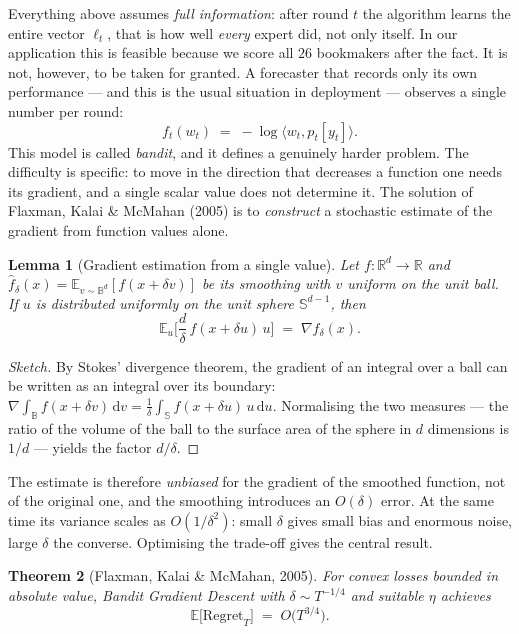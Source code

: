 \documentclass[12pt,a4paper,oneside]{report}
\renewcommand{\_}{\oldunderscore\allowbreak}
\theoremstyle{definition}
\theoremstyle{plain}
\newtheorem{theorem}{Theorem}[chapter]
\newtheorem{lemma}[theorem]{Lemma}
\theoremstyle{remark}
\begin{document}
Everything above assumes \emph{full information}: after round $t$ the algorithm learns the entire
vector $\ell_t$, that is how well \emph{every} expert did, not only itself. In our application
this is feasible because we score all $26$ bookmakers after the fact. It is not, however, to be
taken for granted. A forecaster that records only its own performance --- and this is the usual
situation in deployment --- observes a single number per round:
\[
f_t(w_t) \;=\; -\log\langle w_t, p_t[y_t]\rangle .
\]
This model is called \emph{bandit}, and it defines a genuinely harder problem. The difficulty is
specific: to move in the direction that decreases a function one needs its gradient, and a single
scalar value does not determine it. The solution of Flaxman, Kalai \& McMahan (2005) is to
\emph{construct} a stochastic estimate of the gradient from function values alone.

\begin{lemma}[Gradient estimation from a single value]
\label{lem:one-point}
Let $f:\mathbb{R}^d \to \mathbb{R}$ and $\hat{f}_\delta(x) = \mathbb{E}_{v\sim \mathbb{B}^d}
[f(x+\delta v)]$ be its smoothing with $v$ uniform on the unit \emph{ball}. If $u$ is distributed
uniformly on the unit \emph{sphere} $\mathbb{S}^{d-1}$, then
\[
\mathbb{E}_u\Big[ \frac{d}{\delta}\, f(x + \delta u)\, u \Big] \;=\; \nabla \hat{f}_\delta(x).
\]
\end{lemma}

\begin{proof}[Sketch]
By Stokes' divergence theorem, the gradient of an integral over a ball can be written as an
integral over its boundary: $\nabla \int_{\mathbb{B}} f(x+\delta v)\,\mathrm{d}v =
\frac{1}{\delta}\int_{\mathbb{S}} f(x+\delta u)\, u\, \mathrm{d}u$. Normalising the two measures
--- the ratio of the volume of the ball to the surface area of the sphere in $d$ dimensions is
$1/d$ --- yields the factor $d/\delta$.
\end{proof}

The estimate is therefore \emph{unbiased} for the gradient of the smoothed function, not of the
original one, and the smoothing introduces an $O(\delta)$ error. At the same time its variance
scales as $O(1/\delta^2)$: small $\delta$ gives small bias and enormous noise, large $\delta$ the
converse. Optimising the trade-off gives the central result.

\begin{theorem}[Flaxman, Kalai \& McMahan, 2005]
\label{thm:bgd}
For convex losses bounded in absolute value, Bandit Gradient Descent with
$\delta \sim T^{-1/4}$ and suitable $\eta$ achieves
\[
\mathbb{E}\big[\mathrm{Regret}_T\big] \;=\; O\big(T^{3/4}\big).
\]
\end{theorem}
\end{document}

